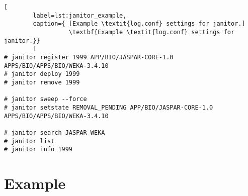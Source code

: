 \begin{lstlisting}[
        label=lst:janitor_example,
        caption={ [Example \textit{log.conf} settings for janitor.]
                  \textbf{Example \textit{log.conf} settings for janitor.}}
        ]
# janitor register 1999 APP/BIO/JASPAR-CORE-1.0 APPS/BIO/APPS/BIO/WEKA-3.4.10
# janitor deploy 1999
# janitor remove 1999

# janitor sweep --force
# janitor setstate REMOVAL_PENDING APP/BIO/JASPAR-CORE-1.0 APPS/BIO/APPS/BIO/WEKA-3.4.10

# janitor search JASPAR WEKA
# janitor list
# janitor info 1999
\end{lstlisting}

% 
% 



\section{Example}
% 
% 

